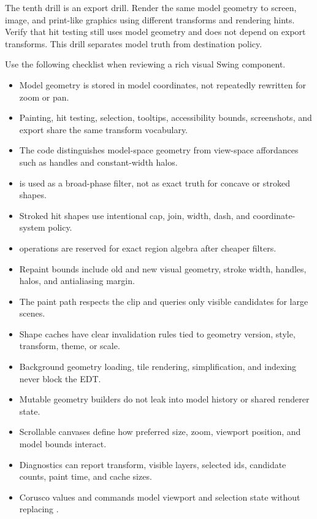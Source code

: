 The tenth drill is an export drill. Render the same model geometry to screen, image, and print-like graphics using different transforms and rendering hints. Verify that hit testing still uses model geometry and does not depend on export transforms. This drill separates model truth from destination policy.

Use the following checklist when reviewing a rich visual Swing component.

\begin{itemize}
\item Model geometry is stored in model coordinates, not repeatedly rewritten for zoom or pan.
\item Painting, hit testing, selection, tooltips, accessibility bounds, screenshots, and export share the same transform vocabulary.
\item The code distinguishes model-space geometry from view-space affordances such as handles and constant-width halos.
\item {} is used as a broad-phase filter, not as exact truth for concave or stroked shapes.
\item Stroked hit shapes use intentional cap, join, width, dash, and coordinate-system policy.
\item {} operations are reserved for exact region algebra after cheaper filters.
\item Repaint bounds include old and new visual geometry, stroke width, handles, halos, and antialiasing margin.
\item The paint path respects the clip and queries only visible candidates for large scenes.
\item Shape caches have clear invalidation rules tied to geometry version, style, transform, theme, or scale.
\item Background geometry loading, tile rendering, simplification, and indexing never block the EDT.
\item Mutable geometry builders do not leak into model history or shared renderer state.
\item Scrollable canvases define how preferred size, zoom, viewport position, and model bounds interact.
\item Diagnostics can report transform, visible layers, selected ids, candidate counts, paint time, and cache sizes.
\item Corusco values and commands model viewport and selection state without replacing .
\end{itemize}


